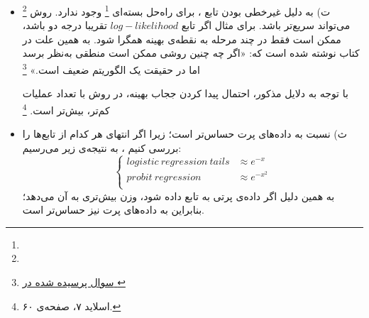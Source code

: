 \begin{itemize}
\begin{itemize}
	  	\footnote{}
	  	از تصمیم‌گیری 
	  	\footnote{}
	  	جدا می‌شود.
	  	\footnote{در استنتاج به دنبال تخمین $p(t|x)$ هستیم اما در تصمیم‌گیری برای $x$ داده شده به دنبال $t$ بهینه هستیم.}
	  	\item از لحاظ محاسباتی کارا است.
	  	\item این امکان را به ما می‌دهد تا:
	  	\begin{itemize}
	  		\item ریسک را حتی اگر ماتریس وزن‌دهی خطا
	  		\footnote{} عوض شد، کمینه کنیم.
	  		\item {} داشته باشیم.
	  		\item {} داشته باشیم.
	  		\item مدل‌ها را ترکیب کنیم.
	  	\end{itemize}
	  \end{itemize}
  \item ت)
  به دلیل غیرخطی بودن تابع ، برای 
  راه‌حل بسته‌ای
  \footnote{}
   وجود ندارد. 
   روش 
   	\footnote{}
    می‌تواند سریع‌تر باشد. برای مثال اگر تابع $log-likelihood$ تقریبا درجه دو باشد، ممکن است فقط در چند مرحله به نقطه‌ی بهینه همگرا شود. به همین علت در کتاب 
     نوشته شده است که:
  «اگر چه چنین روشی ممکن است منطقی به‌نظر برسد اما در حقیقت یک الگوریتم ضعیف است.»
 \footnote{\href{https://stats.stackexchange.com/questions/190298/choosing-irls-over-gradient-descent-in-logistic-regression}{سوال پرسیده شده در }}

 با توجه به دلایل مذکور، احتمال پیدا کردن ججاب بهینه، در روش  با تعداد عملیات کم‌تر، بیش‌تر است. 
 	\footnote{اسلاید ۷، صفحه‌ی ۶۰.}
	\item ث)
	 نسبت به داده‌های پرت حساس‌تر است؛ زیرا اگر انتهای هر کدام از تابع‌ها را بررسی کنیم ، به نتیجه‌ی زیر می‌رسیم:
	$$
	\begin{cases}
		logistic \: regression \: tails  & \approx e^{-x} \\
		probit \: regression   & \approx  e^{-x^2}\\
\end{cases}
	$$
	به همین دلیل اگر داده‌ی پرتی به تابع  داده شود، وزن بیش‌تری به آن می‌دهد؛ بنابراین به داده‌های پرت نیز حساس‌تر است.
\end{itemize}